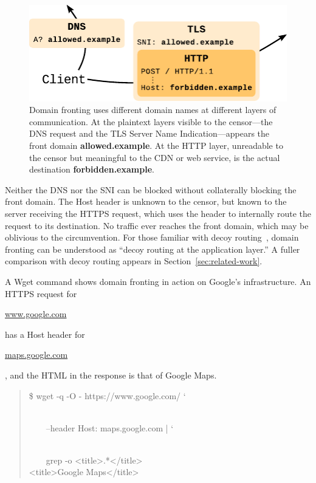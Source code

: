 \documentclass[conference]{IEEEtran}
\def\urll#1{\begin{NoHyper}\url{#1}\end{NoHyper}}
\begin{document}
\begin{figure}[h]
\centering
\includegraphics[width=\linewidth]{fronting}
\caption{
Domain fronting uses different domain names at different layers of communication.
At the plaintext layers visible to the censor---the DNS request and the
TLS Server Name Indication---appears
the front domain \mbox{\textbf{allowed.example}}.
At the HTTP layer, unreadable to the censor but meaningful to the CDN or web service,
is the actual destination \mbox{\textbf{forbidden.example}}.
}
\label{fig:fronting}
\end{figure}

Neither the DNS nor the SNI can be blocked without
collaterally blocking the front domain.
The Host header is unknown to the censor,
but known to the server receiving the HTTPS request,
which uses the header to internally route the request to its destination.
No traffic ever reaches the front domain,
which may be oblivious to the circumvention.
For those familiar with decoy routing~\cite{decoyrouting,telex,cirripede,tapdance},
domain fronting can be understood as
``decoy routing at the application layer.''
A fuller comparison with decoy routing appears in Section~\ref{sec:related-work}.

A Wget command shows domain fronting in action
on Google's infrastructure.
An HTTPS request for \urll{www.google.com} has a Host header for
\urll{maps.google.com}, and the HTML in the response is that of Google Maps.

\noindent
\begin{quote}
%
\$ wget -q -O - https://www.google.com/ \char`\\\\
\strut~~~~--header \textquotesingle{}Host: maps.google.com\textquotesingle{} | \char`\\\\
\strut~~~~grep -o \textquotesingle{}<title>.*</title>\textquotesingle{}\\
<title>Google Maps</title>
\end{quote}
\end{document}
